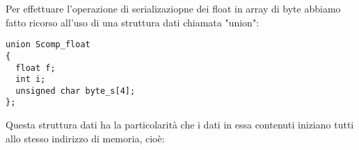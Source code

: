 \documentclass[10pt,a4paper]{article}
\begin{document}
Per effettuare l'operazione di serializaziopne dei float in array di byte abbiamo fatto ricorso all'uso di una struttura dati chiamata "union": 
\begin{lstlisting}[style=myArduino, caption=classe "serial", captionpos=b]
union Scomp_float
{
  float f;
  int i;
  unsigned char byte_s[4];
};
\end{lstlisting}
Questa struttura dati ha la particolarit\`a che i dati in essa contenuti iniziano tutti allo stesso indirizzo di memoria, cio\`e:
\begin{figure}[h]
    \begin{subfigure}[lt]{0.3\textwidth}
    
    \end{subfigure}
    
    
    \begin{subfigure}[rt]{0.3\textwidth}
    
    \end{subfigure}

    
    \begin{subfigure}[lb]{0.3\textwidth}
    
    \end{subfigure}
    
    
    \begin{subfigure}[rb]{0.3\textwidth}
    
    \end{subfigure}    
\end{figure}
\end{document}

